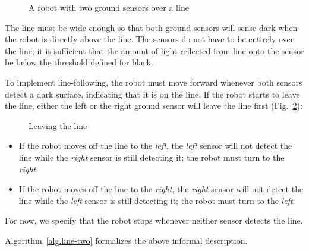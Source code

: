 \begin{figure}
\begin{center}
\caption{A robot with two ground sensors over a line}\label{fig.ground-on-a-line}
\end{center}
\end{figure}

The line must be wide enough so that both ground sensors will sense dark when the robot is directly above the line. The sensors do not have to be entirely over the line; it is sufficient that the amount of light reflected from line onto the sensor be below the threshold defined for black.

To implement line-following, the robot must move forward whenever both sensors detect a dark surface, indicating that it is on the line. If the robot starts to leave the line, either the left or the right ground sensor will leave the line first (Fig.~\ref{fig.leave-left-right}):

\begin{figure}
\begin{center}
\caption{Leaving the line\label{fig.leave-left-right}}
\end{center}
\end{figure}

\begin{itemize}
\item If the robot moves off the line to the \emph{left}, the \emph{left} sensor will not detect the line while the \emph{right} sensor is still detecting it; the robot must turn to the \emph{right}.
\item If the robot moves off the line to the \emph{right}, the \emph{right} sensor will not detect the line while the \emph{left} sensor is still detecting it; the robot must turn to the \emph{left}.
\end{itemize}
For now, we specify that the robot stops whenever neither sensor detects the line.

Algorithm~\ref{alg.line-two} formalizes the above informal description.

